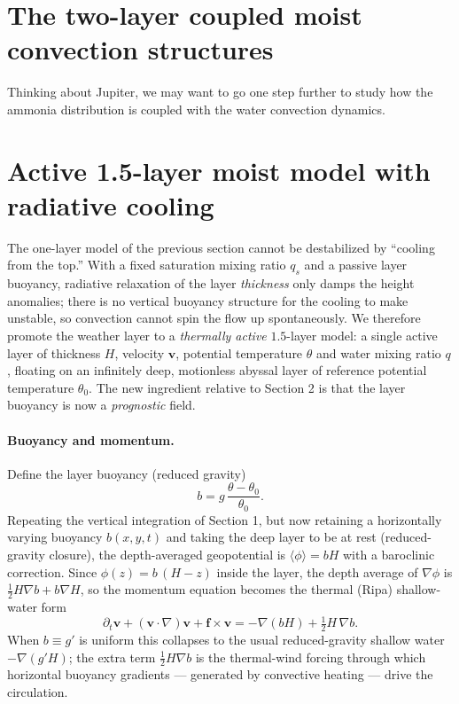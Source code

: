 \documentclass{article}
\begin{document}
\section{The two-layer coupled moist convection structures}
Thinking about Jupiter, we may want to go one step further to study how the ammonia distribution is coupled with the water convection dynamics.

\section{Active 1.5-layer moist model with radiative cooling}
\label{sec:active15}
The one-layer model of the previous section cannot be destabilized by ``cooling from the top.'' With a fixed saturation mixing ratio $q_s$ and a passive layer buoyancy, radiative relaxation of the layer \emph{thickness} only damps the height anomalies; there is no vertical buoyancy structure for the cooling to make unstable, so convection cannot spin the flow up spontaneously. We therefore promote the weather layer to a \emph{thermally active} $1.5$-layer model: a single active layer of thickness $H$, velocity $\mathbf{v}$, potential temperature $\theta$ and water mixing ratio $q$, floating on an infinitely deep, motionless abyssal layer of reference potential temperature $\theta_0$. The new ingredient relative to Section 2 is that the layer buoyancy is now a \emph{prognostic} field.

\paragraph{Buoyancy and momentum.} Define the layer buoyancy (reduced gravity)
\begin{equation}
    b = g\,\frac{\theta-\theta_0}{\theta_0}.
\end{equation}
Repeating the vertical integration of Section 1, but now retaining a horizontally varying buoyancy $b(x,y,t)$ and taking the deep layer to be at rest (reduced-gravity closure), the depth-averaged geopotential is $\langle\phi\rangle = bH$ with a baroclinic correction. Since $\phi(z)=b\,(H-z)$ inside the layer, the depth average of $\nabla\phi$ is $\tfrac{1}{2}H\nabla b + b\nabla H$, so the momentum equation becomes the thermal (Ripa) shallow-water form
\begin{equation}
    \partial_t\mathbf{v} + (\mathbf{v}\cdot\nabla)\mathbf{v} + \mathbf{f}\times\mathbf{v}
    = -\nabla\!\left(bH\right) + \tfrac{1}{2}H\,\nabla b .
    \label{eq:ripa-mom}
\end{equation}
When $b\equiv g'$ is uniform this collapses to the usual reduced-gravity shallow water $-\nabla(g'H)$; the extra term $\tfrac12 H\nabla b$ is the thermal-wind forcing through which horizontal buoyancy gradients --- generated by convective heating --- drive the circulation.
\end{document}
